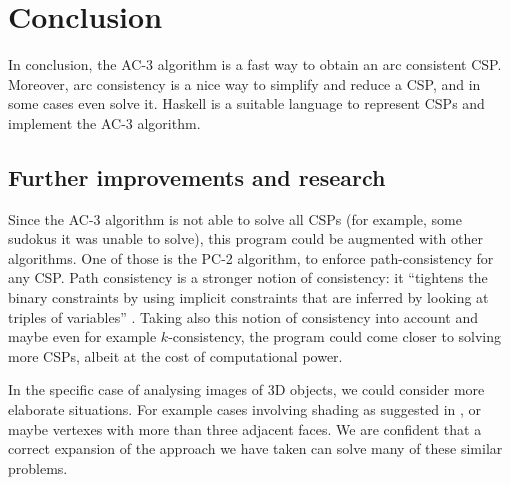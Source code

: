 \section{Conclusion}\label{sec:conclusion}

In conclusion, the AC-3 algorithm is a fast way to obtain an arc consistent CSP. Moreover, arc consistency is a nice way to simplify and reduce a CSP, and in some cases even solve it.
Haskell is a suitable language to represent CSPs and implement the AC-3 algorithm.

\subsection{Further improvements and research}\label{sec:further}

Since the AC-3 algorithm is not able to solve all CSPs (for example, some sudokus it was unable to solve), this program could be augmented with other algorithms.
One of those is the PC-2 algorithm, to enforce path-consistency for any CSP. Path consistency is a stronger notion of consistency: it ``tightens the binary constraints by using implicit constraints that are inferred by looking at triples of variables'' \cite[p.~210]{AIMA}.
Taking also this notion of consistency into account and maybe even for example $k$-consistency, the program could come closer to solving more CSPs, albeit at the cost of computational power.

In the specific case of analysing images of 3D objects, we could consider more elaborate situations. For example cases involving shading as suggested in \cite{winston1992}, or maybe vertexes with more than three adjacent faces.
We are confident that a correct expansion of the approach we have taken can solve many of these similar problems.